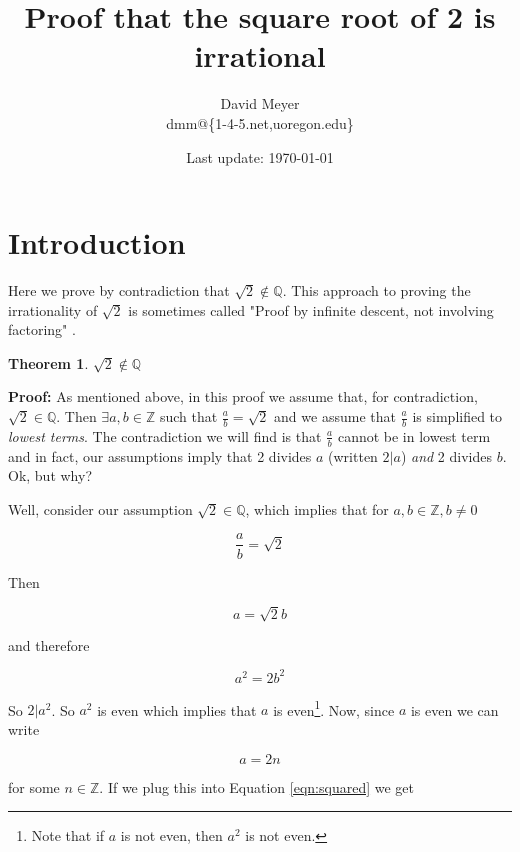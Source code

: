 \documentclass[11pt, oneside]{article}   	%
\title{Proof that the square root of 2 is irrational}
\author{David Meyer \\ dmm@\{1-4-5.net,uoregon.edu\}}
\date{Last update: \today}							%
\theoremstyle{definition}
\newtheorem{thm}{Theorem}[section]
\begin{document}
\maketitle

\section{Introduction}
Here we prove by contradiction that $\sqrt{2} \notin \mathbb{Q}$. This approach to proving the irrationality of $\sqrt{2}$ is sometimes called
"Proof by infinite descent, not involving factoring" \cite{wiki:sqrt2}.

\begin{thm}
$\sqrt{2} \notin \mathbb{Q}$
\end{thm}

\noindent
\textbf{Proof:} As mentioned above, in this proof we assume that, for contradiction,  $\sqrt{2} \in \mathbb{Q}$. Then $\exists a,b  \in \mathbb{Z}$
such that $\frac{a}{b} = \sqrt{2}$ and  we assume that $\frac{a}{b}$ is simplified to \emph{lowest terms}. The contradiction we will find is that 
$\frac{a}{b}$ cannot be in lowest term and in fact, our assumptions imply that 2 divides $a$ (written $2|a$) \emph{and}  2 divides $b$. Ok, but why?


\bigskip
\noindent
Well, consider our assumption $\sqrt{2} \in \mathbb{Q}$, which implies that for $a,b \in \mathbb{Z}, b \neq 0$

\bigskip
\begin{equation*}
\frac{a}{b} = \sqrt{2}
\end{equation*}


\bigskip
\noindent
Then 

\begin{equation*}
a = \sqrt{2} b
\end{equation*}

\bigskip
\noindent
and therefore 

\begin{equation}
a^2 = 2b^2
\label{eqn:squared}
\end{equation}

\bigskip
\noindent
So $2|a^2$. So $a^2$ is even which implies that $a$ is even\footnote{Note that if $a$ is not even, then $a^2$ is not even.}. Now, since $a$ is even we can
write 

\begin{equation}
a = 2n
\label{eqn:a}
\end{equation}

\bigskip
\noindent
for some $n \in \mathbb{Z}$. If we plug this into Equation \ref{eqn:squared} we get
\end{document}
